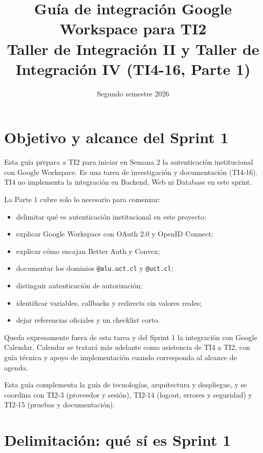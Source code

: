 \documentclass[11pt,a4paper]{article}
\title{
  \textbf{Guía de integración Google Workspace para TI2}\\
  \large Taller de Integración II y Taller de Integración IV (TI4-16, Parte 1)
}
\author{}
\date{Segundo semestre 2026}
\begin{document}
\maketitle

\section{Objetivo y alcance del Sprint 1}

Esta guía prepara a TI2 para iniciar en Semana 2 la autenticación
institucional con Google Workspace. Es una tarea de investigación y
documentación (TI4-16). TI4 no implementa la integración en Backend, Web ni
Database en este sprint.

La Parte 1 cubre solo lo necesario para comenzar:

\begin{itemize}
  \item delimitar qué es autenticación institucional en este proyecto;
  \item explicar Google Workspace con OAuth 2.0 y OpenID Connect;
  \item explicar cómo encajan Better Auth y Convex;
  \item documentar los dominios \texttt{@alu.uct.cl} y \texttt{@uct.cl};
  \item distinguir autenticación de autorización;
  \item identificar variables, callbacks y redirects sin valores reales;
  \item dejar referencias oficiales y un checklist corto.
\end{itemize}

Queda expresamente fuera de esta tarea y del Sprint 1 la integración con
Google Calendar. Calendar se tratará más adelante como asistencia de TI4 a
TI2, con guía técnica y apoyo de implementación cuando corresponda al alcance
de agenda.

Esta guía complementa la guía de tecnologías, arquitectura y despliegue, y se
coordina con TI2-3 (proveedor y sesión), TI2-14 (logout, errores y seguridad)
y TI2-15 (pruebas y documentación).

\section{Delimitación: qué sí es Sprint 1}
\end{document}
